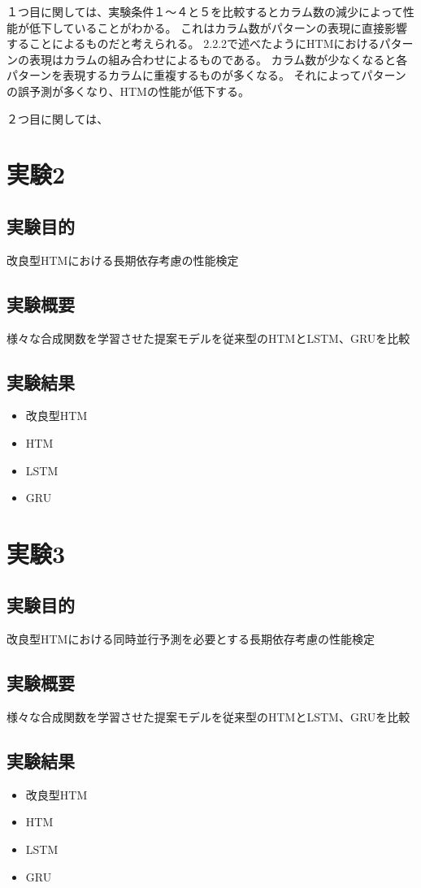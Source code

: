 １つ目に関しては、実験条件１〜４と５を比較するとカラム数の減少によって性能が低下していることがわかる。
これはカラム数がパターンの表現に直接影響することによるものだと考えられる。
2.2.2で述べたようにHTMにおけるパターンの表現はカラムの組み合わせによるものである。
カラム数が少なくなると各パターンを表現するカラムに重複するものが多くなる。
それによってパターンの誤予測が多くなり、HTMの性能が低下する。

２つ目に関しては、
\section{実験2}
\subsection{実験目的}
改良型HTMにおける長期依存考慮の性能検定

\subsection{実験概要}
様々な合成関数を学習させた提案モデルを従来型のHTMとLSTM、GRUを比較

\subsection{実験結果}

\begin{itemize}
  \item 改良型HTM
  \item HTM
  \item LSTM
  \item GRU
\end{itemize}

\section{実験3}
\subsection{実験目的}
改良型HTMにおける同時並行予測を必要とする長期依存考慮の性能検定

\subsection{実験概要}
様々な合成関数を学習させた提案モデルを従来型のHTMとLSTM、GRUを比較

\subsection{実験結果}

\begin{itemize}
  \item 改良型HTM
  \item HTM
  \item LSTM
  \item GRU
\end{itemize}
